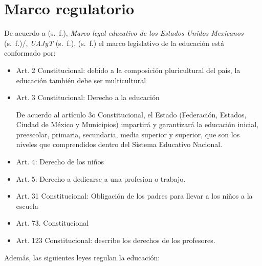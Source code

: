 \documentclass[
  12,
]{scrartcl}
\begin{document}
\newpage

\hypertarget{marco-regulatorio}{%
\section{Marco regulatorio}\label{marco-regulatorio}}

De acuerdo a (s.~f.), \emph{Marco legal educativo de los Estados Unidos
Mexicanos} (s.~f.)/, \emph{UAJyT} (s.~f.), (s.~f.) el marco legislativo
de la educación está conformado por:

\begin{itemize}
\item
  Art. 2 Constitucional: debido a la composición pluricultural del país,
  la educación también debe ser multicultural
\item
  Art. 3 Constitucional: Derecho a la educación

  De acuerdo al artículo 3o Constitucional, el Estado (Federación,
  Estados, Ciudad de México y Municipios) impartirá y garantizará la
  educación inicial, preescolar, primaria, secundaria, media superior y
  superior, que son los niveles que comprendidos dentro del Sistema
  Educativo Nacional.
\item
  Art. 4: Derecho de los niños
\item
  Art. 5: Derecho a dedicarse a una profesion o trabajo.
\item
  Art. 31 Constitucional: Obligación de los padres para llevar a los
  niños a la escuela
\item
  Art. 73. Constitucional
\item
  Art. 123 Constitucional: describe los derechos de los profesores.
\end{itemize}

Además, las siguientes leyes regulan la educación:
\end{document}
